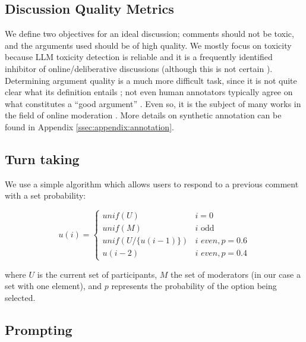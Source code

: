 \subsection{Discussion Quality Metrics}

We define two objectives for an ideal discussion; comments should not be toxic, and the arguments used should be of high quality. We mostly focus on toxicity because \ac{LLM} toxicity detection is reliable \citep{kang-qian-2024-implanting, Wang2022ToxicityDW, anjum2024hate} and it is a frequently identified inhibitor of online/deliberative discussions \citep{dekock2022disagree, XiaToxicity} (although this is not certain \citep{Avalle2024PersistentIP}). Determining argument quality is a much more difficult task, since it is not quite clear what its definition entails \cite{korre2025evaluation}; not even human annotators typically agree on what constitutes a “good argument” \cite{argyle2023}. Even so, it is the subject of many works in the field of online moderation \cite{argyle2023, schroeder-etal-2024-fora, falk-etal-2024-moderation, falk-etal-2021-predicting}. More details on synthetic annotation can be found in Appendix \ref{ssec:appendix:annotation}.


\subsection{Turn taking}
\label{ssec:experimental:turn}

We use a simple algorithm which allows users to respond to a previous comment with a set probability:

\small
\begin{equation}
\label{eq:turn_taking}
    u(i) = \left\{
\begin{array}{ll}
\textit{unif}(U) & i=0\\
    \textit{unif}(M) & i \text{ odd}\\
    \textit{unif}(U/\{u(i-1)\}) & i \textit{ even}, p=0.6 \\
    u(i-2) & i \textit{ even}, p=0.4 
\end{array} 
\right.
\end{equation}
\normalsize

\noindent where $U$ is the current set of participants, $M$ the set of moderators (in our case a set with one element), and $p$ represents the probability of the option being selected.


\subsection{Prompting}
\label{ssec:experimental:prompts}

